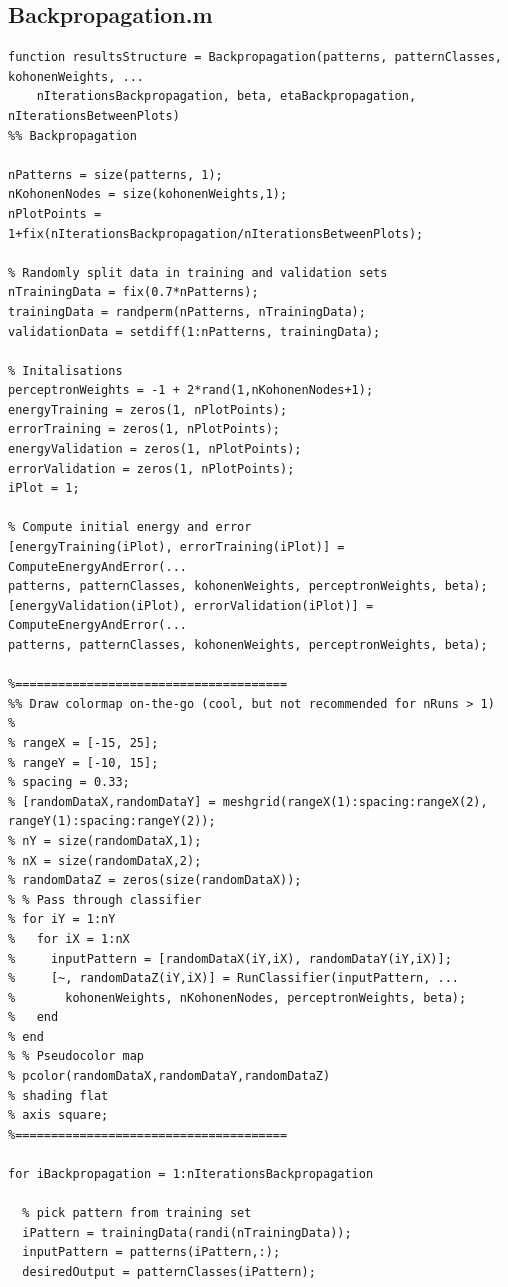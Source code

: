 \documentclass[12pt,titlepage]{article}
\begin{document}
\subsection*{Backpropagation.m}
\begin{lstlisting}
function resultsStructure = Backpropagation(patterns, patternClasses, kohonenWeights, ...
    nIterationsBackpropagation, beta, etaBackpropagation, nIterationsBetweenPlots)
%% Backpropagation

nPatterns = size(patterns, 1);
nKohonenNodes = size(kohonenWeights,1);
nPlotPoints = 1+fix(nIterationsBackpropagation/nIterationsBetweenPlots);

% Randomly split data in training and validation sets
nTrainingData = fix(0.7*nPatterns);
trainingData = randperm(nPatterns, nTrainingData);
validationData = setdiff(1:nPatterns, trainingData);

% Initalisations
perceptronWeights = -1 + 2*rand(1,nKohonenNodes+1);
energyTraining = zeros(1, nPlotPoints);
errorTraining = zeros(1, nPlotPoints);
energyValidation = zeros(1, nPlotPoints);
errorValidation = zeros(1, nPlotPoints);
iPlot = 1;

% Compute initial energy and error
[energyTraining(iPlot), errorTraining(iPlot)] = ComputeEnergyAndError(...
patterns, patternClasses, kohonenWeights, perceptronWeights, beta);
[energyValidation(iPlot), errorValidation(iPlot)] = ComputeEnergyAndError(...
patterns, patternClasses, kohonenWeights, perceptronWeights, beta);

%======================================
%% Draw colormap on-the-go (cool, but not recommended for nRuns > 1)
%
% rangeX = [-15, 25];
% rangeY = [-10, 15];
% spacing = 0.33;
% [randomDataX,randomDataY] = meshgrid(rangeX(1):spacing:rangeX(2), rangeY(1):spacing:rangeY(2));
% nY = size(randomDataX,1);
% nX = size(randomDataX,2);
% randomDataZ = zeros(size(randomDataX));
% % Pass through classifier
% for iY = 1:nY
%   for iX = 1:nX
%     inputPattern = [randomDataX(iY,iX), randomDataY(iY,iX)];
%     [~, randomDataZ(iY,iX)] = RunClassifier(inputPattern, ...
%       kohonenWeights, nKohonenNodes, perceptronWeights, beta);
%   end
% end
% % Pseudocolor map
% pcolor(randomDataX,randomDataY,randomDataZ)
% shading flat
% axis square;
%======================================

for iBackpropagation = 1:nIterationsBackpropagation

  % pick pattern from training set
  iPattern = trainingData(randi(nTrainingData));
  inputPattern = patterns(iPattern,:);
  desiredOutput = patternClasses(iPattern);
  

\end{lstlisting}
\end{document}
